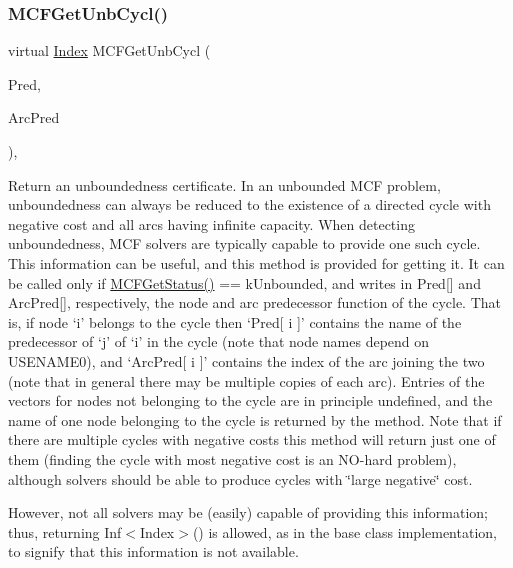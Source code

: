 \subsubsection{\texorpdfstring{M\+C\+F\+Get\+Unb\+Cycl()}{MCFGetUnbCycl()}}
{\footnotesize\ttfamily virtual \mbox{\hyperlink{class_m_c_f_class_ad53d6229d7ec28555a9c9c2fd9abf773}{Index}} M\+C\+F\+Get\+Unb\+Cycl (\begin{DoxyParamCaption}\item[{\mbox{\hyperlink{class_m_c_f_class_ace3388eb329ff0551a0b86b6c67e33d8}{Index\+\_\+\+Set}}}]{Pred,  }\item[{\mbox{\hyperlink{class_m_c_f_class_ace3388eb329ff0551a0b86b6c67e33d8}{Index\+\_\+\+Set}}}]{Arc\+Pred }\end{DoxyParamCaption})\hspace{0.3cm}{\ttfamily [inline]}, {\ttfamily [virtual]}}

Return an unboundedness certificate. In an unbounded M\+CF problem, unboundedness can always be reduced to the existence of a directed cycle with negative cost and all arcs having infinite capacity. When detecting unboundedness, M\+CF solvers are typically capable to provide one such cycle. This information can be useful, and this method is provided for getting it. It can be called only if \mbox{\hyperlink{class_m_c_f_class_a333e27ad7a73779b096cb70829cbe8be}{M\+C\+F\+Get\+Status()}} == k\+Unbounded, and writes in Pred\mbox{[}\mbox{]} and Arc\+Pred\mbox{[}\mbox{]}, respectively, the node and arc predecessor function of the cycle. That is, if node `i' belongs to the cycle then `Pred\mbox{[} i \mbox{]}' contains the name of the predecessor of `j' of `i' in the cycle (note that node names depend on U\+S\+E\+N\+A\+M\+E0), and `Arc\+Pred\mbox{[} i \mbox{]}' contains the index of the arc joining the two (note that in general there may be multiple copies of each arc). Entries of the vectors for nodes not belonging to the cycle are in principle undefined, and the name of one node belonging to the cycle is returned by the method. Note that if there are multiple cycles with negative costs this method will return just one of them (finding the cycle with most negative cost is an N\+O-\/hard problem), although solvers should be able to produce cycles with \char`\"{}large negative\char`\"{} cost.

However, not all solvers may be (easily) capable of providing this information; thus, returning Inf$<$\+Index$>$() is allowed, as in the base class implementation, to signify that this information is not available. \mbox{\label{class_m_c_f_class_a30483c3e5699b77f528c2e6f33c80ece}} 
